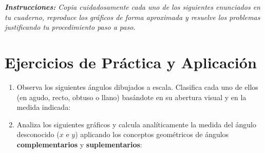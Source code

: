 \documentclass[12pt, letterpaper]{article}
\begin{document}
	\noindent \textit{\textbf{Instrucciones:} Copia cuidadosamente cada uno de los siguientes enunciados en tu cuaderno, reproduce los gráficos de forma aproximada y resuelve los problemas justificando tu procedimiento paso a paso.}
	\vspace{0.6cm}
	
	\section*{Ejercicios de Práctica y Aplicación}
	
	\begin{enumerate}[itemsep=0.8cm]
		
		\item Observa los siguientes ángulos dibujados a escala. Clasifica cada uno de ellos (en agudo, recto, obtuso o llano) basándote en su abertura visual y en la medida indicada:
		
		\vspace{0.3cm}
		\begin{center}
		\end{center}
		
		\item Analiza los siguientes gráficos y calcula analíticamente la medida del ángulo desconocido ($x$ e $y$) aplicando los conceptos geométricos de ángulos \textbf{complementarios} y \textbf{suplementarios}:
		

\end{enumerate}
\end{document}
